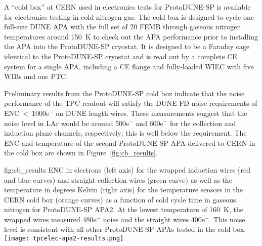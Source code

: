 A ``cold box'' at CERN used in electronics tests for ProtoDUNE-SP is available for electronics testing in cold nitrogen gas. The cold box is designed to cycle one full-size DUNE APA with the full set of 20 FEMB through gaseous nitrogen temperatures around 150~K to check out the APA performance prior to installing the APA into the ProtoDUNE-SP cryostat. It is designed to be a Faraday cage identical to the ProtoDUNE-SP cryostat and is read out by a complete CE system for a single APA, including a CE flange and fully-loaded WIEC with five WIBs and one PTC.

Preliminary results from the ProtoDUNE-SP cold box indicate that
the noise performance of the TPC readout will satisfy the DUNE FD noise requirements of
ENC~<~1000e$^-$ on DUNE length wires. These measurements suggest that the noise level in
LAr would be around 500e$^-$ and 600e$^-$ for the collection and induction plane channels,
respectively; this is well below the requirement.  The ENC and temperature of the second ProtoDUNE-SP
APA delivered to CERN in the cold box are shown in Figure~\ref{fig:cb_results}.

\begin{dunefigure}
{fig:cb_results}
{ENC in electrons (left axis) for the wrapped induction wires (red and blue curves) and 
straight collection wires (green curve) as well as the temperature in degrees Kelvin (right axis) for the temperature
sensors in the CERN cold box (orange curves) as a function of cold cycle time in gaseous nitrogen for ProtoDUNE-SP APA2. 
At the lowest temperature of 160~K, the wrapped wires measured 480e$^-$ noise and the straight 
wires 400e$^-$. This noise level is consistent with all other ProtoDUNE-SP APAs tested in the cold box.}
\texttt{[image: tpcelec-apa2-results.png]}
\end{dunefigure}
